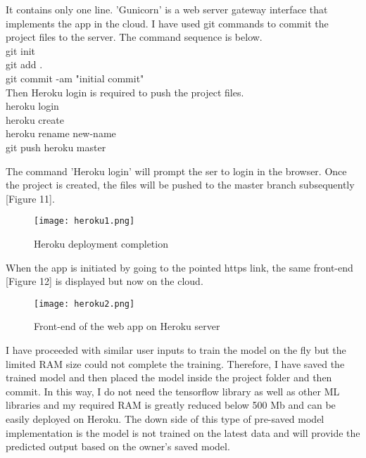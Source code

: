 \documentclass[11pt]{diazessay} %
\begin{document}
It contains only one line. 'Gunicorn' is a web server gateway interface that implements the app in the cloud. I have used git commands to commit the project files to the server. The command sequence is below.\\
{\selectfont
\noindent git init\\
git add .\\
git commit -am "initial commit"\\
}
Then Heroku login is required to push the project files. \\
{\selectfont
\noindent heroku login\\
heroku create\\
heroku rename new-name\\
git push heroku master\\
}

The command 'Heroku login' will prompt the ser to login in the browser. Once the project is created, the files will be pushed to the master branch subsequently [Figure 11].

\begin{figure}[!h]
\begin{center}
\texttt{[image: heroku1.png]} %
\caption{Heroku deployment completion}
\end{center}
\end{figure}

When the app is initiated by going to the pointed https link, the same front-end [Figure 12] is displayed but now on the cloud.

\begin{figure}[!h]
\begin{center}
\texttt{[image: heroku2.png]} %
\caption{Front-end of the web app on Heroku server}
\end{center}
\end{figure}

I have proceeded with similar user inputs to train the model on the fly but the limited RAM size could not complete the training. Therefore, I have saved the trained model and then placed the model inside the project folder and then commit. In this way, I do not need the tensorflow library as well as other ML libraries and my required RAM is greatly reduced below 500 Mb and can be easily deployed on Heroku. The down side of this type of pre-saved model implementation is the model is not trained on the latest data and will provide the predicted output based on the owner's saved model.  
\end{document}
